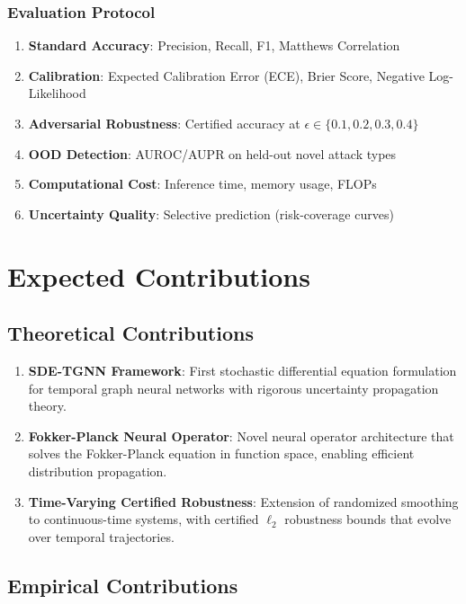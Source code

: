 \documentclass[11pt]{article}
\begin{document}
\subsubsection{Evaluation Protocol}

\begin{enumerate}
    \item \textbf{Standard Accuracy}: Precision, Recall, F1, Matthews Correlation
    \item \textbf{Calibration}: Expected Calibration Error (ECE), Brier Score, Negative Log-Likelihood
    \item \textbf{Adversarial Robustness}: Certified accuracy at $\epsilon \in \{0.1, 0.2, 0.3, 0.4\}$
    \item \textbf{OOD Detection}: AUROC/AUPR on held-out novel attack types
    \item \textbf{Computational Cost}: Inference time, memory usage, FLOPs
    \item \textbf{Uncertainty Quality}: Selective prediction (risk-coverage curves)
\end{enumerate}

\section{Expected Contributions}

\subsection{Theoretical Contributions}

\begin{enumerate}[label=\textbf{C\arabic*.},leftmargin=*]
    \item \textbf{SDE-TGNN Framework}: First stochastic differential equation formulation for temporal graph neural networks with rigorous uncertainty propagation theory.

    \item \textbf{Fokker-Planck Neural Operator}: Novel neural operator architecture that solves the Fokker-Planck equation in function space, enabling efficient distribution propagation.

    \item \textbf{Time-Varying Certified Robustness}: Extension of randomized smoothing to continuous-time systems, with certified $\ell_2$ robustness bounds that evolve over temporal trajectories.
\end{enumerate}

\subsection{Empirical Contributions}
\end{document}

